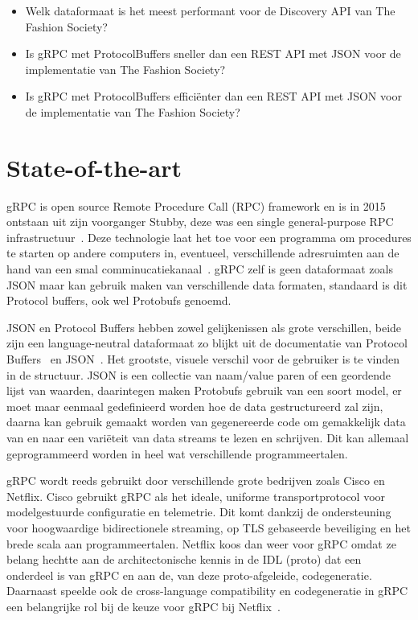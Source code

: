 \begin{itemize}
  \item Welk dataformaat is het meest performant voor de Discovery API van The Fashion Society? 
  \item Is gRPC met ProtocolBuffers sneller dan een REST API met JSON voor de implementatie van The Fashion Society?
  \item Is gRPC met ProtocolBuffers efficiënter dan een REST API met JSON voor de implementatie van The Fashion Society?
  
\end{itemize}


\section{State-of-the-art}
\label{sec:state-of-the-art}
gRPC is open source Remote Procedure Call (RPC) framework en is in 2015 ontstaan uit zijn voorganger Stubby, deze was een single general-purpose RPC infrastructuur~\autocite{gRPC}. Deze technologie laat het toe voor een programma om procedures te starten op andere computers in, eventueel, verschillende adresruimten aan de hand van een smal comminucatiekanaal~\autocite{Nelson1981}. gRPC zelf is geen dataformaat zoals JSON maar kan gebruik maken van verschillende data formaten, standaard is dit Protocol buffers, ook wel Protobufs genoemd.

JSON en Protocol Buffers hebben zowel gelijkenissen als grote verschillen, beide zijn een language-neutral dataformaat zo blijkt uit de documentatie van Protocol Buffers~\autocite{Google} en  JSON~\autocite{Json2017}. Het grootste, visuele verschil voor de gebruiker is te vinden in de structuur. JSON is een collectie van naam/value paren of een geordende lijst van waarden, daarintegen maken Protobufs gebruik van een soort model, er moet maar eenmaal gedefinieerd worden hoe de data gestructureerd zal zijn, daarna kan gebruik gemaakt worden van gegenereerde code om gemakkelijk data van en naar een variëteit van data streams te lezen en schrijven. Dit kan allemaal geprogrammeerd worden in heel wat verschillende programmeertalen.

gRPC wordt reeds gebruikt door verschillende grote bedrijven zoals Cisco en Netflix. 
Cisco gebruikt gRPC als het ideale, uniforme transportprotocol voor modelgestuurde configuratie en telemetrie. Dit komt dankzij de ondersteuning voor hoogwaardige bidirectionele streaming, op TLS gebaseerde beveiliging en het brede scala aan programmeertalen. 
Netflix koos dan weer voor gRPC omdat ze belang hechtte aan de architectonische kennis in de IDL (proto) dat een onderdeel is van gRPC en aan de, van deze proto-afgeleide, codegeneratie. Daarnaast speelde ook de cross-language compatibility en codegeneratie in gRPC een belangrijke rol bij de keuze voor gRPC bij Netflix~\autocite{Foundation2018}.

